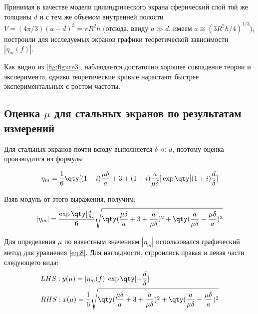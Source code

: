 Принимая в качестве модели цилиндрического экрана сферический слой той же толщины $d$ и с тем же объемом внутренней
полости $V=(4\pi/3)(a-d)^3=\pi R^2h$ (отсюда, ввиду $a\gg d$, имеем $a\cong (3R^2h/4)^{1/3}$), построили для исследуемых
экранов графики теоретической зависимости $|\eta_m(f)|$.

Как видно из \ref{fig:figure3}, наблюдается достаточно хорошее совпадение теории и эксперимента, однако теоретические
кривые нарастают быстрее экспериментальных с ростом частоты.

\subsection{Оценка $\mu$ для стальных экранов по результатам измерений}

Для стальных экранов почти всюду выполняется $\delta \ll d$, поэтому оценка производится из формулы

\begin{gather}
	\eta_m = \frac16\qty[(1-i)\frac{\mu \delta}{a} + 3 + (1+i)\frac{a}{\mu \delta}]\exp\qty[(1+i)\frac{d}{\delta}]
\end{gather}

Взяв модуль от этого выражения, получим:
\begin{gather}
	|\eta_m| = \frac{\exp\qty[\frac{d}{\delta}]}{6}\sqrt{\qty(\frac{\mu \delta}{a} +3 + \frac{a}{\mu \delta} )^2 + \qty(\frac{a}{\mu \delta} - \frac{\mu \delta}{a})^2}
	\label{eq:8}
\end{gather}

Для определения $\mu$ по известным значениям $|\eta_m|$ использовался графический метод для уравнения \eqref{eq:8}.
Для наглядности, стрроились правая и левая части следующего вида:
\begin{equation}
	\begin{aligned}
		&LHS: y(\mu) = |\eta_m(f)|\exp\qty[-\frac{d}{\delta}]\\ 
		&RHS: x(\mu) = \frac16 \sqrt{\qty(\frac{\mu \delta}{a} +3 + \frac{a}{\mu \delta} )^2 + \qty(\frac{a}{\mu \delta} - \frac{\mu \delta}{a})^2}
	\end{aligned}
		\label{eq:9}
\end{equation}

